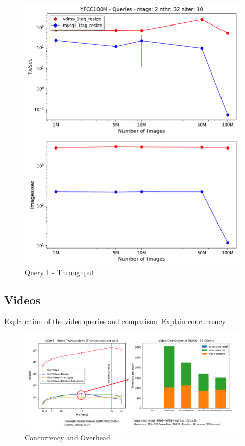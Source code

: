 \begin{figure}[]
\centering
\includegraphics[width=\columnwidth]{figures/q1_throughput}
\caption{Query 1 - Throughput}
\label{fig:q1_throughput}
\end{figure}

\subsection{Videos}

Explanation of the video queries and comparison.
Explain concurrency.

\begin{figure}[]
\centering
\includegraphics[width=\textwidth]{figures/video_overhead}
\caption{Concurrency and Overhead}
\label{fig:video}
\end{figure}


